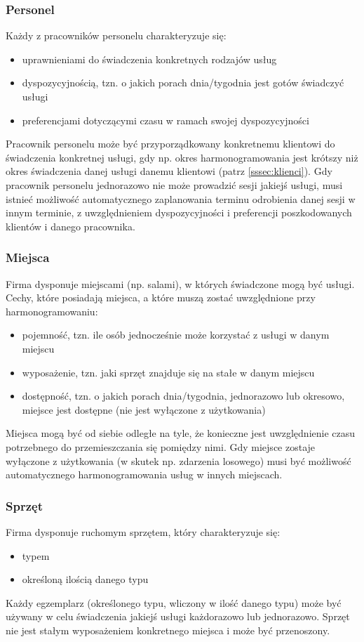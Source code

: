 \subsubsection{Personel}\label{sssec:personel}
Każdy z pracowników personelu charakteryzuje się:
\begin{itemize}
	\item{uprawnieniami do świadczenia konkretnych rodzajów usług}
	\item{dyspozycyjnością, tzn. o jakich porach dnia/tygodnia jest gotów świadczyć usługi}
	\item{preferencjami dotyczącymi czasu w ramach swojej dyspozycyjności}
\end{itemize}
Pracownik personelu może być przyporządkowany konkretnemu klientowi do świadczenia konkretnej usługi, gdy np. okres harmonogramowania jest krótszy niż okres świadczenia danej usługi danemu klientowi (patrz \ref{sssec:klienci}).
Gdy pracownik personelu jednorazowo nie może prowadzić sesji jakiejś usługi, musi istnieć możliwość automatycznego zaplanowania terminu odrobienia danej sesji w innym terminie, z uwzględnieniem dyspozycyjności i preferencji poszkodowanych klientów i danego pracownika.

\subsubsection{Miejsca}\label{sssec:miejsca}
Firma dysponuje miejscami (np. salami), w których świadczone mogą być usługi. Cechy, które posiadają miejsca, a które muszą zostać uwzględnione przy harmonogramowaniu:
\begin{itemize}
	\item{pojemność, tzn. ile osób jednocześnie może korzystać z usługi w danym miejscu}
	\item{wyposażenie, tzn. jaki sprzęt znajduje się na stałe w danym miejscu}
	\item{dostępność, tzn. o jakich porach dnia/tygodnia, jednorazowo lub okresowo, miejsce jest dostępne (nie jest wyłączone z użytkowania)}
\end{itemize}
Miejsca mogą być od siebie odległe na tyle, że konieczne jest uwzględnienie czasu potrzebnego do przemieszczania się pomiędzy nimi.
Gdy miejsce zostaje wyłączone z użytkowania (w skutek np. zdarzenia losowego) musi być możliwość automatycznego harmonogramowania usług w innych miejscach.

\subsubsection{Sprzęt}\label{sssec:sprzet}
Firma dysponuje ruchomym sprzętem, który charakteryzuje się:
\begin{itemize}
	\item{typem}
	\item{określoną ilością danego typu}
\end{itemize}
Każdy egzemplarz (określonego typu, wliczony w ilość danego typu) może być używany w celu świadczenia jakiejś usługi każdorazowo lub jednorazowo.
Sprzęt nie jest stałym wyposażeniem konkretnego miejsca i może być przenoszony.


